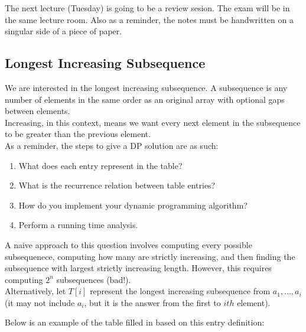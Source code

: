 \documentclass[14pt]{extarticle}
\begin{document}
	\MakeScribeTop

    The next lecture (Tuesday) is going to be a review sesion. The exam will
    be in the same lecture room. Also as a reminder, the notes must be
    handwritten on a singular side of a piece of paper.

    \subsection*{Longest Increasing Subsequence}
    We are interested in the longest increasing subsequence. A subsequence
    is any number of elements in the same order as an original array with
    optional gaps between elements.\\

    Increasing, in this context, means we want every next element in the
    subsequence to be greater than the previous element.\\

    As a reminder, the steps to give a DP solution are as such:
    \begin{enumerate}
        \item What does each entry represent in the table?
        \item What is the recurrence relation between table entries?
        \item How do you implement your dynamic programming algorithm?
        \item Perform a running time analysis.
    \end{enumerate}

    A naive approach to this question involves computing every possible
    subsequenece, computing how many are strictly increasing, and then finding
    the subsequence with largest strictly increasing length. However, this
    requires computing $2^n$ subsequences (bad!).\\

    Alternatively, let $T[i]$ represent the longest increasing subsequence
    from $a_1, \ldots, a_i$ (it may not include $a_i$, but it is the
    answer from the first to $ith$ element).

    Below is an example of the table filled in based on this entry definition:
\end{document}
